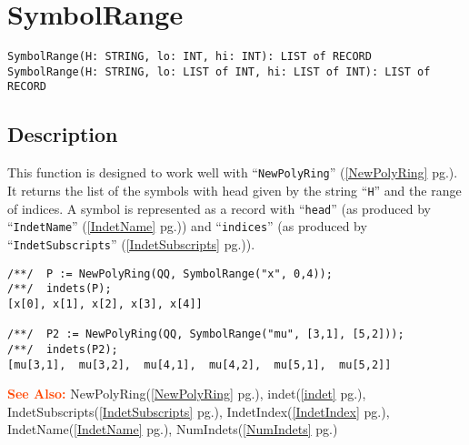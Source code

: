 \documentclass[a4paper]{mybook}
\newenvironment{command}{}{} %
\newcommand\SeeAlso{\par\textcolor{OrangeRed}{\textbf{\large See Also: }}}
\begin{document}
\section{SymbolRange}
\label{SymbolRange}
\begin{command} %


\begin{Verbatim}[label=syntax, rulecolor=\color{MidnightBlue},
frame=single]
SymbolRange(H: STRING, lo: INT, hi: INT): LIST of RECORD
SymbolRange(H: STRING, lo: LIST of INT, hi: LIST of INT): LIST of RECORD
\end{Verbatim}


\subsection*{Description}

This function is designed to work well with ``\verb&NewPolyRing&'' (\ref{NewPolyRing} pg.\pageref{NewPolyRing}).
It returns the list of the symbols with head given by the string ``\verb&H&''
and the range of indices.
A symbol is represented as a record with ``\verb&head&'' (as produced by ``\verb&IndetName&'' (\ref{IndetName} pg.\pageref{IndetName}))
and ``\verb&indices&'' (as produced by ``\verb&IndetSubscripts&'' (\ref{IndetSubscripts} pg.\pageref{IndetSubscripts})).
\begin{Verbatim}[label=example, rulecolor=\color{PineGreen}, frame=single]
/**/  P := NewPolyRing(QQ, SymbolRange("x", 0,4));
/**/  indets(P);
[x[0], x[1], x[2], x[3], x[4]]

/**/  P2 := NewPolyRing(QQ, SymbolRange("mu", [3,1], [5,2]));
/**/  indets(P2);
[mu[3,1],  mu[3,2],  mu[4,1],  mu[4,2],  mu[5,1],  mu[5,2]]
\end{Verbatim}


\SeeAlso %
  NewPolyRing(\ref{NewPolyRing} pg.\pageref{NewPolyRing}), 
    indet(\ref{indet} pg.\pageref{indet}), 
    IndetSubscripts(\ref{IndetSubscripts} pg.\pageref{IndetSubscripts}), 
    IndetIndex(\ref{IndetIndex} pg.\pageref{IndetIndex}), 
    IndetName(\ref{IndetName} pg.\pageref{IndetName}), 
    NumIndets(\ref{NumIndets} pg.\pageref{NumIndets})
\end{command} %
\end{document}
